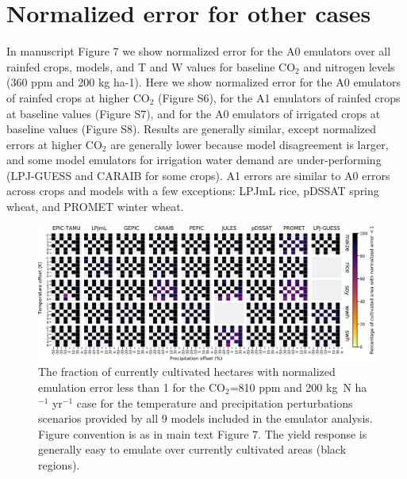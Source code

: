 \documentclass[12pt]{article}
\begin{document}

\clearpage
\section{Normalized error for other cases}
\begin{flushleft}
In manuscript Figure 7 we show normalized error for the A0 emulators over all rainfed crops, models, and T and W values for 
baseline CO$_2$ and nitrogen levels (360 ppm and 200 kg ha-1). Here we show normalized error for the A0 emulators of rainfed crops at higher CO$_2$ (Figure S6), for the A1 emulators of rainfed crops at baseline values (Figure S7), and for the A0 emulators of irrigated crops at 
baseline values (Figure S8). 
Results are generally similar, except normalized errors at higher CO$_2$ are generally lower because model disagreement is larger, and some model emulators for irrigation water demand are under-performing (LPJ-GUESS and CARAIB for some crops).
A1 errors are similar to A0 errors across crops and models with a few exceptions: LPJmL rice, pDSSAT spring wheat, and PROMET winter wheat.
\end{flushleft}

\begin{figure}[h!]
  \centering
  \includegraphics[width=15.5cm]{error_grid_810.png}
  \caption{
  The fraction of currently cultivated hectares with normalized emulation error less than 1 for the CO$_2$=810 ppm and 200 kg~N ha$^{-1}$ yr$^{-1}$ case for the temperature and precipitation perturbations scenarios provided by all 9 models included in the emulator analysis. 
  Figure convention is as in main text Figure 7.
  The yield response is generally easy to emulate over currently cultivated areas (black regions).
  }
  \label{fig:error810}
\end{figure}
\end{document}
